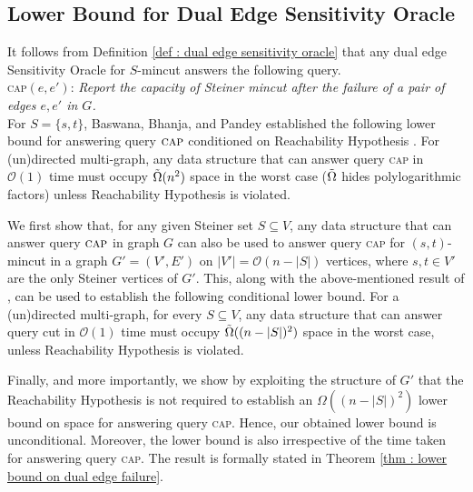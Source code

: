 \documentclass[letterpaper,11pt]{article}
\begin{document}
\subsection{Lower Bound for Dual Edge Sensitivity Oracle}
     It follows from Definition \ref{def : dual edge sensitivity oracle} that any dual edge Sensitivity Oracle for $S$-mincut answers the following query.\\
    \noindent
         \textsc{cap}$(e,e')$: \textit{Report the capacity of Steiner mincut after the failure of a pair of edges $e,e'$ in $G$.}\\     
     For $S=\{s,t\}$, Baswana, Bhanja, and Pandey \cite{DBLP:journals/talg/BaswanaBP23} established the following lower bound for answering query $\textsc{cap}$ conditioned on Reachability Hypothesis \cite{DBLP:conf/wads/GoldsteinKLP17, DBLP:journals/siamcomp/Patrascu11}. 
     For (un)directed multi-graph, any data structure that can answer query \textsc{cap} in ${\mathcal O}(1)$ time must occupy $\Tilde{ \Omega}(n^2)$ space in the worst case ($\Tilde{\Omega}$ hides polylogarithmic factors) unless Reachability Hypothesis \cite{DBLP:conf/wads/GoldsteinKLP17, DBLP:journals/siamcomp/Patrascu11} is violated.


      We first show that, for any given Steiner set $S\subseteq V$, any data structure that can answer query $\textsc{cap}$ in graph $G$ can also be used to answer query \textsc{cap} for $(s,t)$-mincut in a graph $G'=(V',E')$ on $|V'|={\mathcal O}(n-|S|)$ vertices, where $s,t\in V'$ are the only Steiner vertices of $G'$. This, along with the above-mentioned result of \cite{DBLP:journals/talg/BaswanaBP23}, can be used to establish the following conditional lower bound. For a (un)directed multi-graph, for every $S\subseteq V$, any data structure that can answer query cut in ${\mathcal O}(1)$ time must occupy $\Tilde{ \Omega}((n-|S|)^2)$ space in the worst case, unless Reachability Hypothesis \cite{DBLP:conf/wads/GoldsteinKLP17, DBLP:journals/siamcomp/Patrascu11} is violated. 
     
     Finally, and more importantly, we show by exploiting the structure of $G'$ that the Reachability Hypothesis \cite{DBLP:conf/wads/GoldsteinKLP17} is not required to establish an $\Omega((n-|S|)^2)$ lower bound on space for answering query \textsc{cap}. Hence, our obtained lower bound is unconditional. Moreover, the lower bound is also irrespective of the time taken for answering query \textsc{cap}. The result is formally stated in Theorem \ref{thm : lower bound on dual edge failure}. 
\end{document}
